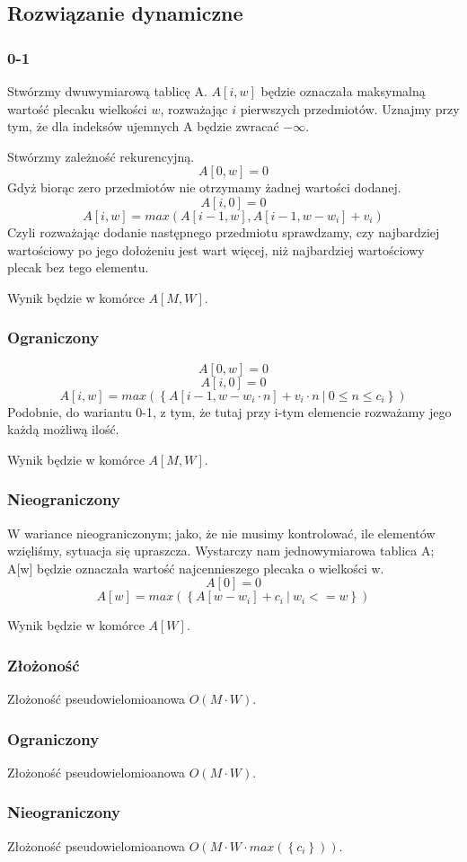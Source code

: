 \subsection{Rozwiązanie dynamiczne}
\subsubsection{0-1}
Stwórzmy dwuwymiarową tablicę A.
$A[i, w]$ będzie oznaczała maksymalną wartość plecaku wielkości $w$, rozważając $i$ pierwszych przedmiotów.
Uznajmy przy tym, że dla indeksów ujemnych A będzie zwracać $-\infty$.

Stwórzmy zależność rekurencyjną.
\[A[0, w] = 0\]
Gdyż biorąc zero przedmiotów nie otrzymamy żadnej wartości dodanej.
\[A[i, 0] = 0\]
\[A[i, w] = max(A[i - 1, w], A[i - 1, w - w_i] + v_i)\]
Czyli rozważając dodanie następnego przedmiotu sprawdzamy, czy najbardziej wartościowy po jego dołożeniu jest wart więcej, niż najbardziej wartościowy plecak bez tego elementu.

Wynik będzie w komórce $A[M, W]$.

\subsubsection{Ograniczony}
\[A[0, w] = 0\]
\[A[i, 0] = 0\]
\[A[i, w] = max(\left \{ A[i - 1, w - w_i \cdot n] + v_i \cdot n ~|~ 0 \leq n \leq c_i \right \})\]
Podobnie, do wariantu 0-1, z tym, że tutaj przy i-tym elemencie rozważamy jego każdą możliwą ilość.

Wynik będzie w komórce $A[M, W]$.

\subsubsection{Nieograniczony}
W wariance nieograniczonym; jako, że nie musimy kontrolować, ile elementów wzięliśmy, sytuacja się upraszcza.
Wystarczy nam jednowymiarowa tablica A; A[w] będzie oznaczała wartość najcennieszego plecaka o wielkości w.
\[A[0] = 0\]
\[A[w] = max(\left \{ A[w - w_i] + c_i ~|~ w_i <= w \right \})\]

Wynik będzie w komórce $A[W]$.

\subsubsection{Złożoność}
Złożoność pseudowielomioanowa $O(M \cdot W)$.
\subsubsection{Ograniczony}
Złożoność pseudowielomioanowa $O(M \cdot W)$.
\subsubsection{Nieograniczony}
Złożoność pseudowielomioanowa $O(M \cdot W \cdot max(\left \{ c_i \right \}))$.
